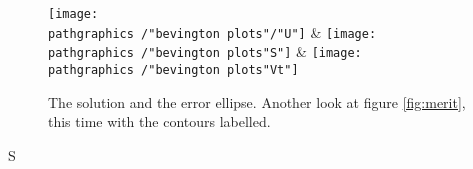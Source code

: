 \begin{figure}[t]
	\texttt{[image: \\pathgraphics /"bevington plots"/"U"]} &
	\texttt{[image: \\pathgraphics /"bevington plots"S"]} &
	\texttt{[image: \\pathgraphics /"bevington plots"Vt"]} \\
	\caption[The solution and the error ellipse]{The solution and the error ellipse. Another look at figure \eqref{fig:merit}, this time with the contours labelled.}
	\label{fig:ellipse}
\end{figure}
S
\endinput  %